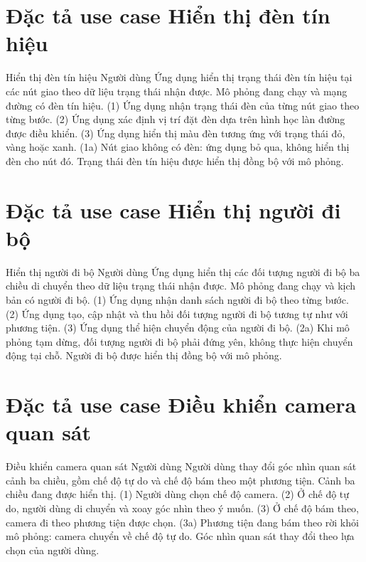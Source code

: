 \documentclass[../DoAn.tex]{subfiles}
\begin{document}
\section{Đặc tả use case Hiển thị đèn tín hiệu}

\uctable
    {Hiển thị đèn tín hiệu}
    {Người dùng}
    {Ứng dụng hiển thị trạng thái đèn tín hiệu tại các nút giao theo dữ liệu trạng thái nhận được.}
    {Mô phỏng đang chạy và mạng đường có đèn tín hiệu.}
    {(1) Ứng dụng nhận trạng thái đèn của từng nút giao theo từng bước. (2) Ứng dụng xác định vị trí đặt đèn dựa trên hình học làn đường được điều khiển. (3) Ứng dụng hiển thị màu đèn tương ứng với trạng thái đỏ, vàng hoặc xanh.}
    {(1a) Nút giao không có đèn: ứng dụng bỏ qua, không hiển thị đèn cho nút đó.}
    {Trạng thái đèn tín hiệu được hiển thị đồng bộ với mô phỏng.}

\section{Đặc tả use case Hiển thị người đi bộ}

\uctable
    {Hiển thị người đi bộ}
    {Người dùng}
    {Ứng dụng hiển thị các đối tượng người đi bộ ba chiều di chuyển theo dữ liệu trạng thái nhận được.}
    {Mô phỏng đang chạy và kịch bản có người đi bộ.}
    {(1) Ứng dụng nhận danh sách người đi bộ theo từng bước. (2) Ứng dụng tạo, cập nhật và thu hồi đối tượng người đi bộ tương tự như với phương tiện. (3) Ứng dụng thể hiện chuyển động của người đi bộ.}
    {(2a) Khi mô phỏng tạm dừng, đối tượng người đi bộ phải đứng yên, không thực hiện chuyển động tại chỗ.}
    {Người đi bộ được hiển thị đồng bộ với mô phỏng.}

\section{Đặc tả use case Điều khiển camera quan sát}

\uctable
    {Điều khiển camera quan sát}
    {Người dùng}
    {Người dùng thay đổi góc nhìn quan sát cảnh ba chiều, gồm chế độ tự do và chế độ bám theo một phương tiện.}
    {Cảnh ba chiều đang được hiển thị.}
    {(1) Người dùng chọn chế độ camera. (2) Ở chế độ tự do, người dùng di chuyển và xoay góc nhìn theo ý muốn. (3) Ở chế độ bám theo, camera đi theo phương tiện được chọn.}
    {(3a) Phương tiện đang bám theo rời khỏi mô phỏng: camera chuyển về chế độ tự do.}
    {Góc nhìn quan sát thay đổi theo lựa chọn của người dùng.}
\end{document}
